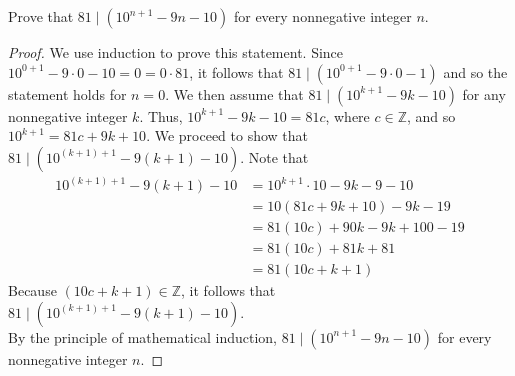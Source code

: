 \documentclass[12pt]{article}
\newcommand{\Z}{\mathbb{Z}}
\newenvironment{problem}[2][Problem]{\begin{trivlist}
		\item[\hskip \labelsep {\bfseries #1}\hskip \labelsep {\bfseries #2.}]}{\end{trivlist}}
\begin{document}
\begin{problem}{26}
	Prove that $81\mid (10^{n+1}-9n-10)$ for every nonnegative integer $n$.
	\begin{proof}
		We use induction to prove this statement. Since $10^{0+1}-9\cdot 0 -10 = 0 = 0\cdot 81$, it follows that $81\mid (10^{0+1}-9\cdot 0 -1)$ and so the statement holds for $n=0$. We then assume that $81\mid (10^{k+1}-9k-10)$ for any nonnegative integer $k$. Thus, $10^{k+1}-9k-10 = 81c$, where $c\in \Z$, and so $10^{k+1} = 81c+9k+10$. We proceed to show that $81\mid (10^{(k+1)+1}-9(k+1)-10)$. Note that 
		\begin{align*}
			10^{(k+1)+1}-9(k+1)-10 &= 10^{k+1}\cdot 10-9k- 9-10\\
			&= 10(81c+9k+10)-9k-19\\
			&= 81(10c) +90k-9k+100-19\\
			&= 81(10c) +81k +81\\
			&= 81(10c+k+1)
		\end{align*}
	Because $(10c+k+1)\in \Z$, it follows that $81\mid (10^{(k+1)+1}-9(k+1)-10)$.\\
	By the principle of mathematical induction, $81\mid (10^{n+1}-9n-10)$ for every nonnegative integer $n$.
	\end{proof}
\end{problem}
\end{document}
